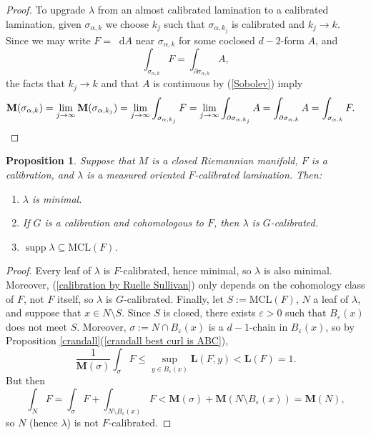 \documentclass[reqno,11pt]{amsart}
\newcommand*\dif{\mathop{}\!\mathrm{d}}
\DeclareMathOperator{\supp}{supp}
\newcommand{\MCL}{\mathrm{MCL}}
\newcommand{\Mass}{\mathbf M}
\newcommand{\Comass}{\mathbf L}
\newtheorem{proposition}[theorem]{Proposition}
\theoremstyle{definition}
\numberwithin{equation}{section}
\begin{document}
\begin{proof}
To upgrade $\lambda$ from an almost calibrated lamination to a calibrated lamination, given $\sigma_{\alpha, k}$ we choose $k_j$ such that $\sigma_{\alpha, k_j}$ is calibrated and $k_j \to k$.
Since we may write $F = \dif A$ near $\sigma_{\alpha, k}$ for some coclosed $d - 2$-form $A$, and 
$$\int_{\sigma_{\alpha, k}} F = \int_{\partial \sigma_{\alpha, k}} A,$$
the facts that $k_j \to k$ and that $A$ is continuous by (\ref{Sobolev}) imply 
\begin{align*}
\Mass(\sigma_{\alpha, k}) &= \lim_{j \to \infty} \Mass(\sigma_{\alpha, k_j}) = \lim_{j \to \infty} \int_{\sigma_{\alpha, k_j}} F = \lim_{j \to \infty} \int_{\partial \sigma_{\alpha, k_j}} A = \int_{\partial \sigma_{\alpha, k}} A = \int_{\sigma_{\alpha, k}} F. \qedhere 
\end{align*}
\end{proof}

\begin{proposition}\label{properties of calibrated laminations}
Suppose that $M$ is a closed Riemannian manifold, $F$ is a calibration, and $\lambda$ is a measured oriented $F$-calibrated lamination.
Then:
\begin{enumerate}
\item $\lambda$ is minimal.
\item If $G$ is a calibration and cohomologous to $F$, then $\lambda$ is $G$-calibrated.
\item $\supp \lambda \subseteq \MCL(F)$.
\end{enumerate}
\end{proposition}
\begin{proof}
Every leaf of $\lambda$ is $F$-calibrated, hence minimal, so $\lambda$ is also minimal.
Moreover, (\ref{calibration by Ruelle Sullivan}) only depends on the cohomology class of $F$, not $F$ itself, so $\lambda$ is $G$-calibrated.
Finally, let $S := \MCL(F)$, $N$ a leaf of $\lambda$, and suppose that $x \in N \setminus S$.
Since $S$ is closed, there exists $\varepsilon > 0$ such that $B_\varepsilon(x)$ does not meet $S$.
Moreover, $\sigma := N \cap B_\varepsilon(x)$ is a $d-1$-chain in $B_\varepsilon(x)$, so by Proposition \ref{crandall}(\ref{crandall best curl is ABC}),
$$\frac{1}{\Mass(\sigma)} \int_\sigma F \leq \sup_{y \in B_\varepsilon(x)} \Comass(F, y) < \Comass(F) = 1.$$
But then 
$$\int_N F = \int_\sigma F + \int_{N \setminus B_\varepsilon(x)} F < \Mass(\sigma) + \Mass(N \setminus B_\varepsilon(x)) = \Mass(N),$$
so $N$ (hence $\lambda$) is not $F$-calibrated.
\end{proof}
\end{document}
